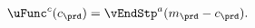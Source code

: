   \begin{equation}\begin{gathered}\begin{aligned}
        \uFunc^{{c}}({c}_{\prd})   & = \vEndStp^{{a}}({m}_{\prd}-{c}_{\prd}).
        \label{eq:upEqbetaOp}
      \end{aligned}\end{gathered}\end{equation}
